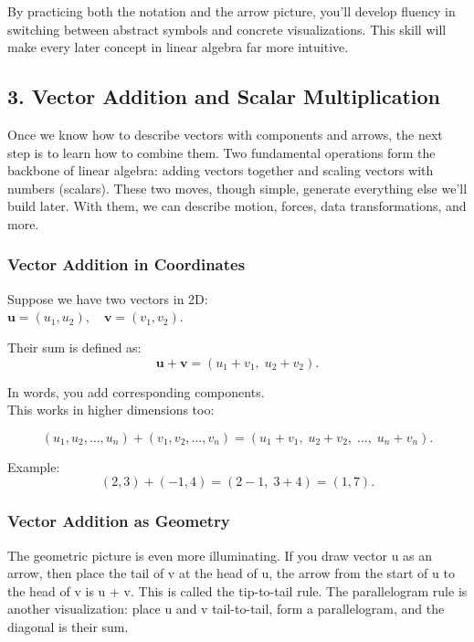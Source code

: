\documentclass[
  letterpaper,
  DIV=11,
  numbers=noendperiod]{scrreprt}
\begin{document}
By practicing both the notation and the arrow picture, you'll develop
fluency in switching between abstract symbols and concrete
visualizations. This skill will make every later concept in linear
algebra far more intuitive.

\subsection{3. Vector Addition and Scalar
Multiplication}\label{vector-addition-and-scalar-multiplication}

Once we know how to describe vectors with components and arrows, the
next step is to learn how to combine them. Two fundamental operations
form the backbone of linear algebra: adding vectors together and scaling
vectors with numbers (scalars). These two moves, though simple, generate
everything else we'll build later. With them, we can describe motion,
forces, data transformations, and more.

\subsubsection{Vector Addition in
Coordinates}\label{vector-addition-in-coordinates}

Suppose we have two vectors in 2D:\\
\(\mathbf{u} = (u_1, u_2), \quad \mathbf{v} = (v_1, v_2)\).

Their sum is defined as:\\
\[
\mathbf{u} + \mathbf{v} = (u_1 + v_1, \; u_2 + v_2).
\]

In words, you add corresponding components.\\
This works in higher dimensions too:

\[
(u_1, u_2, \ldots, u_n) + (v_1, v_2, \ldots, v_n) = (u_1 + v_1, \; u_2 + v_2, \; \ldots, \; u_n + v_n).
\]

Example: \[
(2, 3) + (-1, 4) = (2 - 1, \; 3 + 4) = (1, 7).
\]

\subsubsection{Vector Addition as
Geometry}\label{vector-addition-as-geometry}

The geometric picture is even more illuminating. If you draw vector u as
an arrow, then place the tail of v at the head of u, the arrow from the
start of u to the head of v is u + v. This is called the tip-to-tail
rule. The parallelogram rule is another visualization: place u and v
tail-to-tail, form a parallelogram, and the diagonal is their sum.
\end{document}
